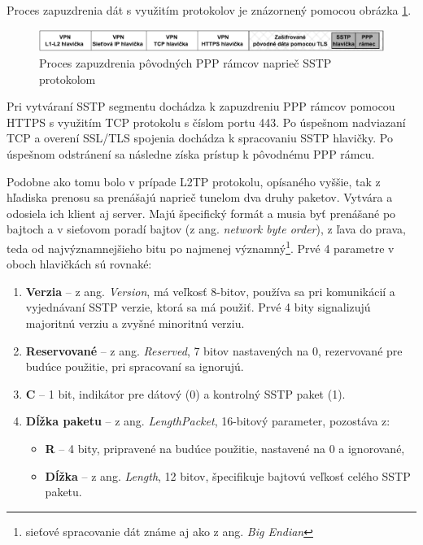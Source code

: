 Proces zapuzdrenia dát s využitím protokolov je znázornený pomocou obrázka \ref{sstpprotocolstack}. 
\begin{figure}[!h]
	\centering
	\includegraphics[width=1\textwidth]{figures/sstpprotocolstack}
	\caption{Proces zapuzdrenia pôvodných PPP rámcov naprieč SSTP protokolom}
	\label{sstpprotocolstack}
\end{figure}
Pri vytváraní SSTP segmentu dochádza k zapuzdreniu PPP rámcov pomocou HTTPS s využitím TCP protokolu s číslom portu 443. Po úspešnom nadviazaní TCP a overení SSL/TLS spojenia dochádza k spracovaniu SSTP hlavičky. Po úspešnom odstránení sa následne získa prístup k pôvodnému PPP rámcu.   

Podobne ako tomu bolo v prípade L2TP protokolu, opísaného vyššie, tak z hľadiska prenosu sa prenášajú naprieč tunelom dva druhy paketov. Vytvára a odosiela ich klient aj server. Majú špecifický formát a musia byť prenášané po bajtoch a v sieťovom poradí bajtov (z ang. \textit{network byte order}), z ľava do prava, teda od najvýznamnejšieho bitu po najmenej významný\footnote{sieťové spracovanie dát známe aj ako z ang. \textit{Big Endian}}. Prvé 4 parametre v oboch hlavičkách sú rovnaké: 
\begin{enumerate}
	\item{\textbf{Verzia}} -- z ang. \textit{Version}, má veľkosť 8-bitov, používa sa pri komunikácií a vyjednávaní SSTP verzie, ktorá sa má použiť. Prvé 4 bity signalizujú majoritnú verziu a zvyšné minoritnú verziu. 
	\item{\textbf{Reservované}} -- z ang. \textit{Reserved}, 7 bitov nastavených na 0, rezervované pre budúce použitie, pri spracovaní sa ignorujú.
	\item{\textbf{C}} -- 1 bit, indikátor pre dátový (0) a kontrolný SSTP paket (1). 
	\item{\textbf{Dĺžka paketu}} -- z ang. \textit{LengthPacket}, 16-bitový parameter, pozostáva z:
		\begin{itemize}
			\item{\textbf{R}} -- 4 bity, pripravené na budúce použitie, nastavené na 0 a ignorované,
			\item{\textbf{Dĺžka}} -- z ang. \textit{Length}, 12 bitov, špecifikuje bajtovú veľkosť celého SSTP paketu.
		\end{itemize}
\end{enumerate}
 
